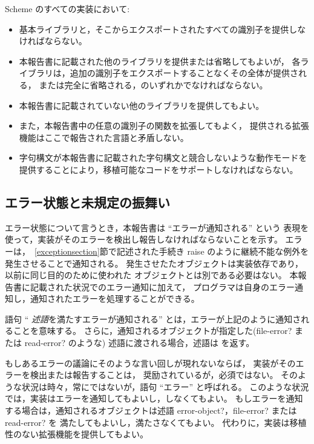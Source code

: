 Scheme のすべての実装において:
\begin{itemize}

\item 基本ライブラリと，そこからエクスポートされたすべての識別子を提供しなければならない。

\item 本報告書に記載された他のライブラリを提供または省略してもよいが，
各ライブラリは，追加の識別子をエクスポートすることなくその全体が提供される，
または完全に省略される，のいずれかでなければならない。

\item 本報告書に記載されていない他のライブラリを提供してもよい。

\item また，本報告書中の任意の識別子の関数を拡張してもよく，
提供される拡張機能はここで報告された言語と矛盾しない。

\item 字句構文が本報告書に記載された字句構文と競合しないような動作モードを
提供することにより，移植可能なコードをサポートしなければならない。
\end{itemize}

\subsection{エラー状態と未規定の振舞い}
\label{errorsituations}

エラー状態について言うとき，本報告書は ``エラーが通知される'' という
表現を使って，実装がそのエラーを検出し報告しなければならないことを示す。
エラーは，~\ref{exceptionsection}節で記述された手続き {\cf raise}
のように継続不能な例外を発生させることで通知される。
発生させたたオブジェクトは実装依存であり，以前に同じ目的のために使われた
オブジェクトとは別である必要はない。
本報告書に記載された状況でのエラー通知に加えて，
プログラマは自身のエラー通知し，通知されたエラーを処理することができる。

語句 `` {\em 述語}を満たすエラーが通知される'' とは，エラーが上記のように通知されることを意味する。
さらに，通知されるオブジェクトが指定した({\cf file-error?} または {\cf read-error?} のような)
述語に渡される場合，述語は \schtrue{} を返す。

\vest もしあるエラーの議論にそのような言い回しが現れないならば，
実装がそのエラーを検出または報告することは，
奨励されているが，必須ではない。
そのような状況は時々，常にではないが，語句 ``エラー'' と呼ばれる。
このような状況では，実装はエラーを通知してもよいし，しなくてもよい。
もしエラーを通知する場合は，通知されるオブジェクトは述語
{\cf error-object?}，{\cf file-error?} または{\cf read-error?} を
満たしてもよいし，満たさなくてもよい。
代わりに，実装は移植性のない拡張機能を提供してもよい。


